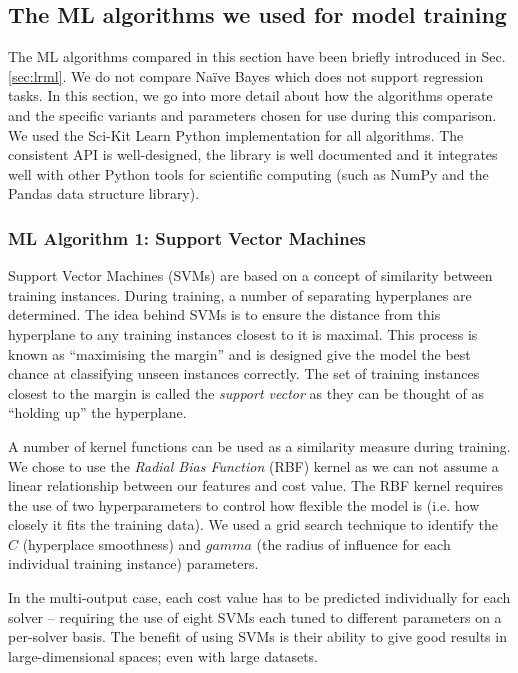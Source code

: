 \subsection{The ML algorithms we used for model training}

\label{sub:MLalgorithms}
The ML algorithms compared in this section have been briefly introduced in Sec. \ref{sec:lrml}. 
We do not compare Na\"ive Bayes which does not support regression tasks. 
In this section, we go into more detail about how the algorithms operate and the specific variants and parameters chosen for use during this comparison.
We used the Sci-Kit Learn \cite{sklearn} Python implementation for all algorithms.
The consistent API is well-designed, the library is well documented and it integrates well with other Python tools for scientific computing (such as NumPy and the Pandas data structure library).


\subsubsection{ML Algorithm 1: Support Vector Machines}

Support Vector Machines (SVMs) \cite{svm} are based on a concept of similarity between training instances. 
During training, a number of separating hyperplanes are determined.
The idea behind SVMs is to ensure the distance from this hyperplane to any training instances closest to it is maximal.
This process is known as ``maximising the margin'' and is designed give the model the best chance at classifying unseen instances correctly. 
The set of training instances closest to the margin is called the \textit{support vector} as they can be thought of as ``holding up'' the hyperplane.

A number of kernel functions can be used as a similarity measure during training.
We chose to use the \textit{Radial Bias Function} (RBF) kernel as we can not assume a linear relationship between our features and cost value. 
The RBF kernel requires the use of two hyperparameters to control how flexible the model is (i.e. how closely it fits the training data). 
We used a grid search technique \cite{hsu2003practical} to identify the $C$ (hyperplace smoothness) and $gamma$ (the radius of influence for each individual training instance) parameters.

In the multi-output case, each cost value has to be predicted individually for each solver -- requiring the use of eight SVMs each tuned to different parameters on a per-solver basis.
The benefit of using SVMs is their ability to give good results in large-dimensional spaces; even with large datasets. 

